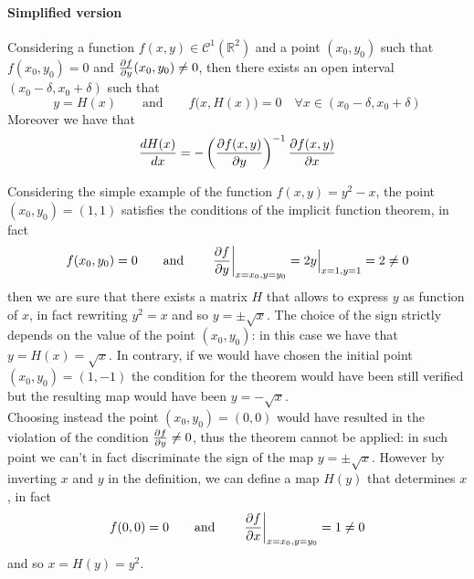 	\paragraph{Simplified version} Considering a function $f(x,y) \in \mathcal C^1(\mathds R^2)$ and a point $(x_0,y_0)$ such that $f(x_0,y_0) = 0$ and $\frac{\partial f}{\partial y}(x_0,y_0) \neq 0$, then there exists an open interval $(x_0-\delta, x_0+\delta)$ such that
	\[ y = H(x) \qquad \textrm{and} \qquad f\big(x, H(x)\big) = 0 \quad \forall x \in (x_0-\delta, x_0 +\delta) \]
	Moreover we have that
	\begin{equation}
		\frac{dH(x)}{dx} = - \left(\frac{\partial f(x,y)}{\partial y}\right)^{-1} \frac{\partial f(x,y)}{\partial x}
	\end{equation}
	
	Considering the simple example of the function $f(x,y) = y^2 - x$, the point $(x_0,y_0) = (1,1)$ satisfies the conditions of the implicit function theorem, in fact
	\[ f(x_0,y_0) = 0 \qquad \textrm{and} \qquad \left.\frac{\partial f}{\partial y}\right|_{x = x_0,y = y_0} = 2y \Big|_{x = 1,y = 1} = 2 \neq 0 \]
	then we are sure that there exists a matrix $H$ that allows to express $y$ as function of $x$, in fact rewriting $y^2 = x$ and so $y = \pm \sqrt x$. The choice of the sign strictly depends on the value of the point $(x_0,y_0)$: in this case we have that $y = H(x) = \sqrt x$. In contrary, if we would have chosen the initial point $(x_0,y_0) = (1,-1)$ the condition for the theorem would have been still verified but the resulting map would have been $y = - \sqrt x$.\\
	Choosing instead the point $(x_0,y_0) = (0,0)$ would have resulted in the violation of the condition $\frac{\partial f}{\partial y} \neq 0$, thus the theorem cannot be applied: in such point we can't in fact discriminate the sign of the map $y = \pm \sqrt x$. However by inverting $x$ and $y$ in the definition, we can define a map $H(y)$ that determines $x$, in fact
	\[ f(0,0) = 0 \qquad \text{and} \qquad \left.\frac{\partial f}{\partial x}\right|_{x = x_0,y = y_0} = 1 \neq 0 \]
	and so $x = H(y) = y^2$.
	
